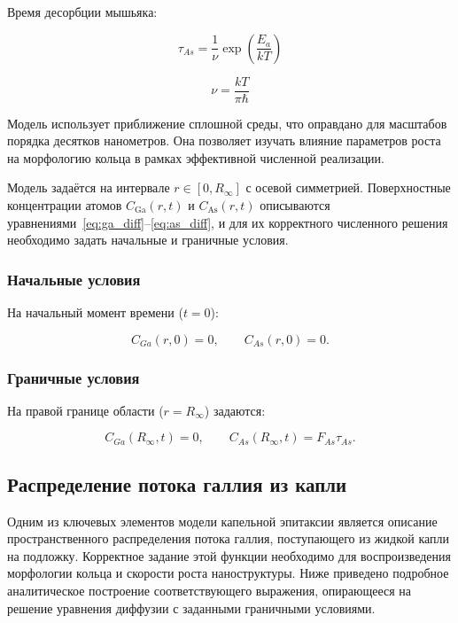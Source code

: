 \documentclass[14pt,oneside]{extarticle}
\begin{document}
Время десорбции мышьяка:

\begin{equation}
\tau_{As}=\frac{1}{\nu}\exp\left(\frac{E_{a}}{kT}\right)
\end{equation}

\begin{equation}
\nu=\frac{kT}{\pi\hbar}
\end{equation}

Модель использует приближение сплошной среды, что оправдано для масштабов порядка десятков нанометров. Она позволяет изучать влияние параметров роста на морфологию кольца в рамках эффективной численной реализации.

Модель задаётся на интервале $r \in [0, R_\infty]$ с осевой симметрией. Поверхностные концентрации атомов $C_{\text{Ga}}(r,t)$ и $C_{\text{As}}(r,t)$ описываются уравнениями~\eqref{eq:ga_diff}–\eqref{eq:as_diff}, и для их корректного численного решения необходимо задать начальные и граничные условия.

\subsubsection*{Начальные условия}

На начальный момент времени ($t = 0$): 

\begin{equation}
C_{Ga}\left(r,0\right)=0, \qquad
C_{As}\left(r,0\right)=0.
\end{equation}

\subsubsection*{Граничные условия}

На правой границе области ($r = R_\infty$) задаются:

\begin{equation}
C_{Ga}\left(R_{\infty},t\right)=0, \qquad
C_{As}\left(R_{\infty},t\right)=F_{As}\tau_{As}.
\end{equation}

\subsection{Распределение потока галлия из капли}

Одним из ключевых элементов модели капельной эпитаксии является описание пространственного распределения потока галлия, поступающего из жидкой капли на подложку. Корректное задание этой функции необходимо для воспроизведения морфологии кольца и скорости роста наноструктуры. Ниже приведено подробное аналитическое построение соответствующего выражения, опирающееся на решение уравнения диффузии с заданными граничными условиями.
\end{document}
